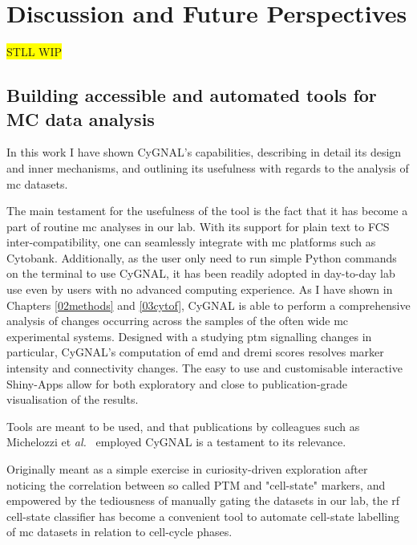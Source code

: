 \chapter{Discussion and Future Perspectives}
\label{07disc}
\colorbox{yellow}{STLL WIP}

\section{Building accessible and automated tools for MC data analysis}

In this work I have shown CyGNAL's capabilities, describing in detail its design and inner mechanisms, and outlining its usefulness with regards to the analysis of \acrshort{mc} datasets.

The main testament for the usefulness of the tool is the fact that it has become a part of routine \acrshort{mc} analyses in our lab. With its support for plain text to FCS inter-compatibility, one can seamlessly integrate with \acrshort{mc} platforms such as Cytobank. Additionally, as the user only need to run simple Python commands on the terminal to use CyGNAL, it has been readily adopted in day-to-day lab use even by users with no advanced computing experience. 
As I have shown in Chapters \ref{02methods} and \ref{03cytof}, CyGNAL is able to perform a comprehensive analysis of changes occurring across the samples of the often wide \acrshort{mc} experimental systems. Designed with a studying \acrshort{ptm} signalling changes in particular, CyGNAL's computation of \acrshort{emd} and \acrshort{dremi} scores resolves marker intensity and connectivity changes. The easy to use and customisable interactive Shiny-Apps allow for both exploratory and close to publication-grade visualisation of the results. 

Tools are meant to be used, and that publications by colleagues such as Michelozzi et \emph{al.}~\cite{michelozzi_activation_2023} employed CyGNAL is a testament to its relevance.

Originally meant as a simple exercise in curiosity-driven exploration after noticing the correlation between so called PTM and "cell-state" markers, and empowered by the tediousness of manually gating the datasets in our lab, the \acrshort{rf} cell-state classifier has become a convenient tool to automate cell-state labelling of \acrshort{mc} datasets in relation to cell-cycle phases.

